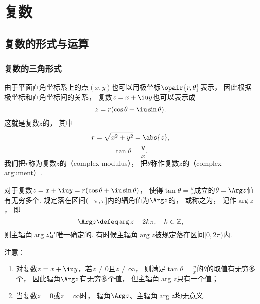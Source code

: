 \chapter{复数}
\section{复数的形式与运算}
\subsection{复数的三角形式}
\begin{definition}[复数的三角形式]
由于平面直角坐标系上的点\((x,y)\)也可以用极坐标\(\opair{r,\theta}\)表示，
因此根据极坐标和直角坐标间的关系，
复数\(z=x+\iu y\)也可以表示成\begin{equation*}
	z = r(\cos\theta+\iu\sin\theta).
\end{equation*}
这就是复数\(z\)的，
其中\begin{equation*}
	r = \sqrt{x^2+y^2} = \abs{z},
\end{equation*}\begin{equation*}
	\tan\theta = \frac{y}{x}.
\end{equation*}
我们把\(r\)称为复数\(z\)的（complex modulus），
把\(\theta\)称作复数\(z\)的（complex argument）.
\end{definition}

对于复数\(z=x+\iu y=r(\cos\theta+\iu\sin\theta)\)，
使得\(\tan\theta=\frac{y}{x}\)成立的\(\theta=\Arg z\)值有无穷多个.
规定落在区间\((-\pi,\pi]\)内的辐角值为\(\Arg z\)的，
或称之为，
记作\(\arg{z}\)，
即\begin{equation*}
	\Arg z \defeq \arg{z} + 2k\pi, \quad k\in\mathbb{Z},
\end{equation*}
则主辐角\(\arg{z}\)是唯一确定的.
有时候主辐角\(\arg{z}\)被规定落在区间\([0,2\pi)\)内.

注意：\begin{enumerate}
	\item 对复数\(z = x + \iu y\)，若\(z \neq 0\)且\(z \neq \infty\)，
	则满足\(\tan \theta = \frac{y}{x}\)的\(\theta\)的取值有无穷多个，
	因此辐角\(\Arg z\)有无穷多个值，
	但主辐角\(\arg z\)只有一个值；
	\item 当复数\(z = 0\)或\(z = \infty\)时，
	辐角\(\Arg z\)、主辐角\(\arg{z}\)均无意义.
\end{enumerate}

